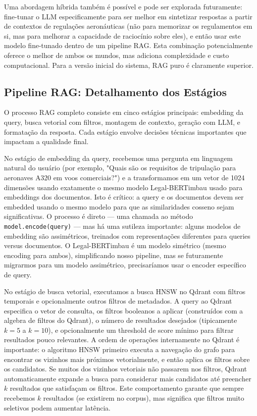 \documentclass[12pt,a4paper]{article}
\begin{document}
Uma abordagem híbrida também é possível e pode ser explorada futuramente: fine-tunar o LLM especificamente para ser melhor em sintetizar respostas a partir de contextos de regulações aeronáuticas (não para memorizar os regulamentos em si, mas para melhorar a capacidade de raciocínio sobre eles), e então usar este modelo fine-tunado dentro de um pipeline RAG. Esta combinação potencialmente oferece o melhor de ambos os mundos, mas adiciona complexidade e custo computacional. Para a versão inicial do sistema, RAG puro é claramente superior.

\subsection{Pipeline RAG: Detalhamento dos Estágios}

O processo RAG completo consiste em cinco estágios principais: embedding da query, busca vetorial com filtros, montagem de contexto, geração com LLM, e formatação da resposta. Cada estágio envolve decisões técnicas importantes que impactam a qualidade final.

No estágio de embedding da query, recebemos uma pergunta em linguagem natural do usuário (por exemplo, "Quais são os requisitos de tripulação para aeronaves A320 em voos comerciais?") e a transformamos em um vetor de 1024 dimensões usando exatamente o mesmo modelo Legal-BERTimbau usado para embeddings dos documentos. Isto é crítico: a query e os documentos devem ser embedded usando o mesmo modelo para que as similaridades cosseno sejam significativas. O processo é direto — uma chamada ao método \texttt{model.encode(query)} — mas há uma sutileza importante: alguns modelos de embedding são assimétricos, treinados com representações diferentes para queries versus documentos. O Legal-BERTimbau é um modelo simétrico (mesmo encoding para ambos), simplificando nosso pipeline, mas se futuramente migrarmos para um modelo assimétrico, precisaríamos usar o encoder específico de query.

No estágio de busca vetorial, executamos a busca HNSW no Qdrant com filtros temporais e opcionalmente outros filtros de metadados. A query ao Qdrant especifica o vetor de consulta, os filtros booleanos a aplicar (construídos com a algebra de filtros do Qdrant), o número de resultados desejados (tipicamente $k=5$ a $k=10$), e opcionalmente um threshold de score mínimo para filtrar resultados pouco relevantes. A ordem de operações internamente no Qdrant é importante: o algoritmo HNSW primeiro executa a navegação do grafo para encontrar os vizinhos mais próximos vetorialmente, e então aplica os filtros sobre os candidatos. Se muitos dos vizinhos vetoriais não passarem nos filtros, Qdrant automaticamente expande a busca para considerar mais candidatos até preencher $k$ resultados que satisfaçam os filtros. Este comportamento garante que sempre recebemos $k$ resultados (se existirem no corpus), mas significa que filtros muito seletivos podem aumentar latência.
\end{document}
